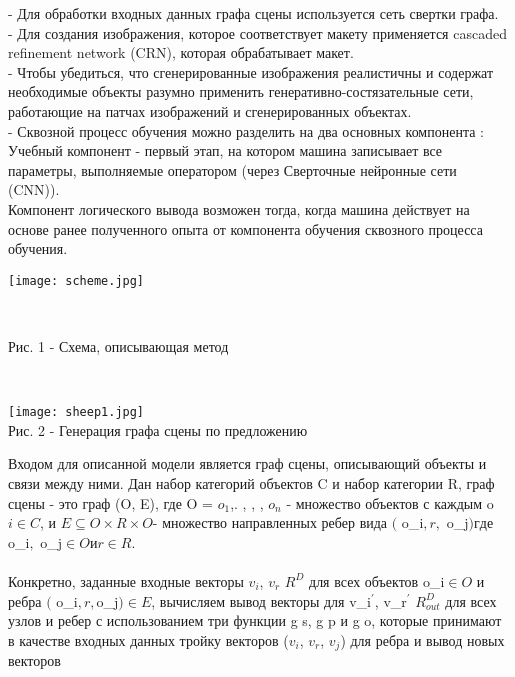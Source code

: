 \documentclass{article}
\begin{document}
 - Для обработки входных данных графа сцены используется сеть свертки графа.\\
 - Для создания изображения, которое соответствует макету применяется cascaded refinement network (CRN), которая
обрабатывает макет.\\
 - Чтобы убедиться, что сгенерированные изображения реалистичны и содержат необходимые объекты разумно применить
генеративно-состязательные сети, работающие на патчах изображений и сгенерированных объектах.\\
 - Сквозной процесс обучения можно разделить на два основных компонента :\\ 
 Учебный компонент - первый этап, на котором машина записывает все параметры, выполняемые оператором (через
 Сверточные нейронные сети (CNN)). \\
  Компонент логического вывода возможен тогда, когда машина действует на основе ранее полученного опыта от компонента обучения сквозного процесса обучения. \\
  \begin{center}
  \texttt{[image: scheme.jpg]}
  \end{center}
  \\
  \begin{center} 
  \caption*{Рис. 1 - Схема, описывающая метод}
  \end{center} 
  \\
  \begin{center} 
  \texttt{[image: sheep1.jpg]}
  \\
  \caption*{Рис. 2 - Генерация графа сцены по предложению}
  \end{center} 
  \large Входом для описанной модели является граф сцены, описывающий объекты и связи между ними. Дан набор категорий объектов C и набор
категории R, граф сцены - это граф (O, E), где
O = {$ o_{1}$,. , , , $ o_{n}$} - множество объектов с каждым o $i \in C$, и
 $E \subseteq O \times R \times O $- 
 \large множество направленных ребер вида 
$($ o_{i}$, r, $ o_{j}$) где $ o_{i}$, $ o_{j}$ \in O и r \in R$. \\ \\
Конкретно, заданные входные векторы $ v_{i}$, $ v_{r}$ \in $R^D$ для всех
объектов $ $o_{i}$ \in O $ и ребра $ ($ o_{i}$, r, $o_{j}$) \in E $, вычисляем вывод
векторы для $ $v_{i}$^\prime$, $ $v_{r}$^\prime$ \in $R^D_{out} $ для всех узлов и ребер с использованием
три функции g s, g p и g o, которые принимают в качестве входных данных тройку
векторов ($v_{i}$, $v_{r}$, $v_{j}$) для ребра и вывод новых векторов
\end{document}
